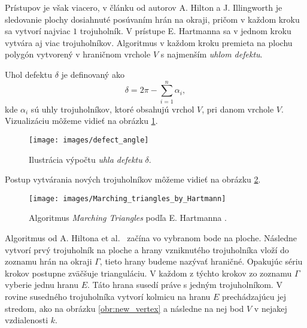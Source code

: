 Prístupov je však viacero, v článku od autorov A. Hilton a J. Illingworth \cite{hilton1996marching}
je sledovanie plochy dosiahnuté posúvaním hrán na okraji, pričom v každom kroku sa vytvorí 
najviac $1$ trojuholník. V prístupe E. Hartmanna \cite{hartmann1998marching} sa v jednom kroku 
vytvára aj viac trojuholníkov. Algoritmus v každom kroku premieta na plochu polygón vytvorený
v hraničnom vrchole $V$ s najmenším \textit{uhlom defektu}. 

\begin{definition}
    Uhol defektu $\delta$ je definovaný ako 
    $$ \delta = 2 \pi - \sum_{i=1}^{n} \alpha_i,$$
    kde $\alpha_i$ sú uhly trojuholníkov, ktoré obsahujú vrchol $V$, pri danom vrchole $V$.
    Vizualizáciu môžeme vidieť na obrázku \ref{obr:defect_angle}.
\end{definition}


\begin{figure}
    \centerline{\texttt{[image: images/defect\_angle]}}
    \caption[Uhol defektu]
    {Ilustrácia výpočtu \textit{uhla defektu} $\delta$.}
    \label{obr:defect_angle}
\end{figure}

Postup vytvárania nových trojuholníkov môžeme vidieť na obrázku \ref{obr:Marching_triangles_by_Hartmann}.

\begin{figure}
    \centerline{\texttt{[image: images/Marching\_triangles\_by\_Hartmann]}}
    \caption[Algoritmus Marching Triangles podľa E. Hartmanna]
    {Algoritmus \textit{Marching Triangles} podľa E. Hartmanna \cite{hartmann1998marching}.}
    \label{obr:Marching_triangles_by_Hartmann}
\end{figure}

Algoritmus od A. Hiltona et al.~\cite{hilton1996marching} začína vo vybranom bode na ploche. 
Následne vytvorí prvý trojuholník na ploche a hrany vzniknutého 
trojuholníka vloží do zoznamu hrán na okraji $\Gamma$, tieto hrany budeme nazývať hraničné. 
Opakujúc sériu krokov postupne zväčšuje trianguláciu. V každom z týchto krokov zo zoznamu $\Gamma$
vyberie jednu hranu $E$. Táto hrana susedí práve s jedným trojuholníkom. V rovine susedného 
trojuholníka vytvorí kolmicu na hranu $E$ prechádzajúcu jej stredom, 
ako na obrázku \ref{obr:new_vertex} a následne na nej bod 
$V$ v nejakej vzdialenosti $k$. 

